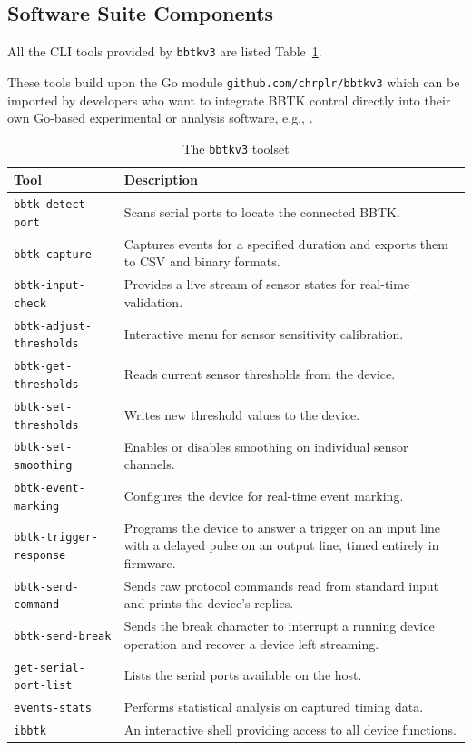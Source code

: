 \documentclass[jou,a4paper]{apa7}
\begin{document}
\subsection{Software Suite Components}

All the CLI tools provided by \texttt{bbtkv3}  are listed 
Table~\ref{tab:tools}.  

These tools build upon the Go module \texttt{github.com/chrplr/bbtkv3} which can be imported by developers who want to integrate BBTK control directly into
their own Go-based experimental or analysis software, e.g.,
\parencite{goxpyrepo}.


\begin{table}[ht]
	\caption{The \texttt{bbtkv3} toolset}
	\label{tab:tools}
	\small
	\begin{tabular}{@{}lp{}@{}}
		\toprule
		Tool & Description \\
		\midrule
		\texttt{bbtk-detect-port} & Scans serial ports to locate the connected BBTK. \\
		\texttt{bbtk-capture} & Captures events for a specified duration and exports them to CSV and binary formats. \\
		\texttt{bbtk-input-check} & Provides a live stream of sensor states for real-time validation. \\
		\texttt{bbtk-adjust-thresholds} & Interactive menu for sensor sensitivity calibration. \\
		\texttt{bbtk-get-thresholds} & Reads current sensor thresholds from the device. \\
		\texttt{bbtk-set-thresholds} & Writes new threshold values to the device. \\
		\texttt{bbtk-set-smoothing} & Enables or disables smoothing on individual sensor channels. \\
		\texttt{bbtk-event-marking} & Configures the device for real-time event marking. \\
		\texttt{bbtk-trigger-response} & Programs the device to answer a trigger on an input line with a delayed pulse on an output line, timed entirely in firmware. \\
		\texttt{bbtk-send-command} & Sends raw protocol commands read from standard input and prints the device's replies. \\
		\texttt{bbtk-send-break} & Sends the break character to interrupt a running device operation and recover a device left streaming. \\
		\texttt{get-serial-port-list} & Lists the serial ports available on the host. \\
		\texttt{events-stats} & Performs statistical analysis on captured timing data. \\
		\texttt{ibbtk} & An interactive shell providing access to all device functions. \\
		\bottomrule
	\end{tabular}
\end{table}
\end{document}
